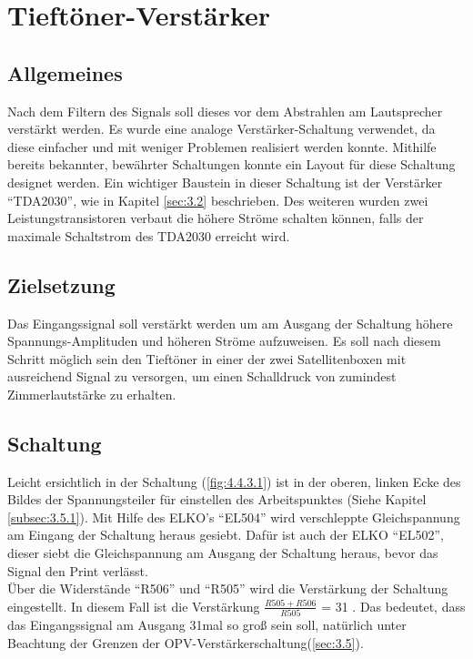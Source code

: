 \null\newpage
\section{Tieftöner-Verstärker}\label{sec:4.4}
\subsection{Allgemeines}\label{subsec:4.4.1}
Nach dem Filtern des Signals soll dieses vor dem Abstrahlen am Lautsprecher verstärkt werden.
Es wurde eine analoge Verstärker-Schaltung verwendet, da diese einfacher und mit weniger Problemen realisiert werden konnte.
Mithilfe bereits bekannter, bewährter Schaltungen konnte ein Layout für diese Schaltung designet werden.
Ein wichtiger Baustein in dieser Schaltung ist der Verstärker \enquote{TDA2030}, wie in Kapitel \ref{sec:3.2} beschrieben.
Des weiteren wurden zwei Leistungstransistoren verbaut die höhere Ströme schalten können, falls der maximale Schaltstrom des TDA2030 erreicht wird.

\subsection{Zielsetzung}\label{subsec:4.4.2}
Das Eingangssignal soll verstärkt werden um am Ausgang der Schaltung höhere Spannungs-Amplituden und höheren Ströme aufzuweisen.
Es soll nach diesem Schritt möglich sein den Tieftöner in einer der zwei Satellitenboxen mit ausreichend Signal zu versorgen, um einen Schalldruck von zumindest Zimmerlautstärke zu erhalten. 

\subsection{Schaltung}\label{subsec:4.4.3}
Leicht ersichtlich in der Schaltung (\ref{fig:4.4.3.1}) ist in der oberen, linken Ecke des Bildes der Spannungsteiler für einstellen des Arbeitspunktes (Siehe Kapitel \ref{subsec:3.5.1}).
Mit Hilfe des ELKO's \enquote{EL504} wird verschleppte Gleichspannung am Eingang der Schaltung heraus gesiebt.
Dafür ist auch der ELKO \enquote{EL502}, dieser siebt die Gleichspannung am Ausgang der Schaltung heraus, bevor das Signal den Print verlässt. \\
Über die Widerstände \enquote{R506} und \enquote{R505} wird die Verstärkung der Schaltung eingestellt.
In diesem Fall ist die Verstärkung $\frac{R505+R506}{R505}$ = 31 .
Das bedeutet, dass das Eingangssignal am Ausgang 31mal so groß sein soll, natürlich unter Beachtung der Grenzen der OPV-Verstärkerschaltung(\ref{sec:3.5}).

